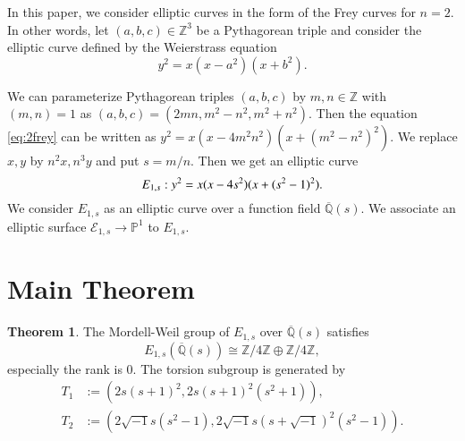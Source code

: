 \documentclass[a4paper]{jarticle} %
\theoremstyle{definition}
\newtheorem{thm}{Theorem}[section]
\theoremstyle{remark}
\begin{document}
In this paper, we consider elliptic curves in the form of the Frey curves for $n=2$.
In other words, let $(a,b,c) \in \mathbb{Z}^3$ be a Pythagorean triple and consider the elliptic curve defined by the Weierstrass equation
\begin{equation}
    \label{eq:2frey}
    y^{2} = x(x - a^{2})(x + b^{2}).
\end{equation}

We can parameterize Pythagorean triples $(a,b,c)$ by $m,n \in \mathbb{Z}$ with $(m,n)=1$ as $(a,b,c) = (2mn, m^{2} - n^{2}, m^{2} + n^{2})$.
Then the equation \eqref{eq:2frey} can be written as $y^{2} = x(x - 4m^2n^2)(x + (m^{2} - n^2)^{2})$.
We replace $x,y$ by $n^2x, n^3y$ and put $s = m/n$.
Then we get an elliptic curve
\begin{equation}
    \label{eq:E_{1,s}}
    E_{1,s}: y^{2} = x(x - 4s^{2})(x + (s^{2} - 1)^{2}).
\end{equation}
We consider $E_{1,s}$ as an elliptic curve over a function field $\overline{\mathbb{Q}}(s)$.
We associate an elliptic surface $\mathcal{E}_{1,s} \to \mathbb{P}^1$ to $E_{1,s}$.


\section{Main Theorem}

\begin{thm}
    \label{thm:E_{1,s}}
    The Mordell-Weil group of $E_{1,s}$ over $\overline{\mathbb{Q}}(s)$ satisfies
    \begin{equation*}
        E_{1,s}(\overline{\mathbb{Q}}(s)) \cong \mathbb{Z} / 4 \mathbb{Z} \oplus \mathbb{Z} / 4 \mathbb{Z},
    \end{equation*}
    especially the rank is $0$. The torsion subgroup is generated by
    \begin{align*}
        T_1 & := (2s(s+1)^2, 2s(s+1)^2(s^2+1)),                               \\
        T_2 & := (2 \sqrt{-1} s(s^2-1),2 \sqrt{-1} s(s+\sqrt{-1})^2(s^2-1)).
    \end{align*}
\end{thm}
\end{document}
